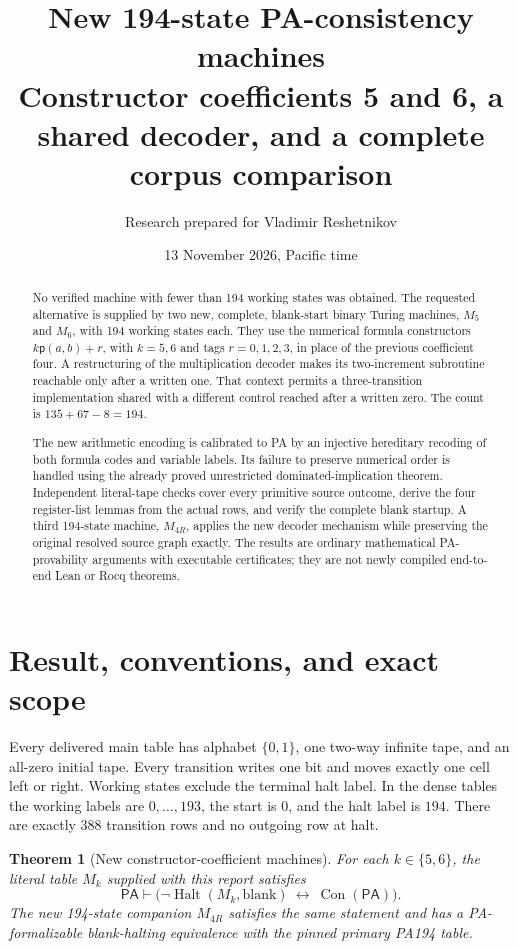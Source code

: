 \documentclass[10pt,letterpaper]{article}
\title{\color{ink}New 194-state PA-consistency machines\\[4pt]\large Constructor coefficients 5 and 6, a shared decoder, and a complete corpus comparison}
\author{Research prepared for Vladimir Reshetnikov}
\date{13 November 2026, Pacific time}
\newtheorem{theorem}{Theorem}
\newcommand{\PA}{\mathsf{PA}}
\newcommand{\Con}{\operatorname{Con}}
\newcommand{\Halt}{\operatorname{Halt}}
\newcommand{\pair}{\mathsf p}
\begin{document}
\maketitle
\begin{abstract}
No verified machine with fewer than 194 working states was obtained. The requested alternative is supplied by two new, complete, blank-start binary Turing machines, $M_5$ and $M_6$, with 194 working states each. They use the numerical formula constructors $k\pair(a,b)+r$, with $k=5,6$ and tags $r=0,1,2,3$, in place of the previous coefficient four. A restructuring of the multiplication decoder makes its two-increment subroutine reachable only after a written one. That context permits a three-transition implementation shared with a different control reached after a written zero. The count is $135+67-8=194$.

The new arithmetic encoding is calibrated to PA by an injective hereditary recoding of both formula codes and variable labels. Its failure to preserve numerical order is handled using the already proved unrestricted dominated-implication theorem. Independent literal-tape checks cover every primitive source outcome, derive the four register-list lemmas from the actual rows, and verify the complete blank startup. A third 194-state machine, $M_{4R}$, applies the new decoder mechanism while preserving the original resolved source graph exactly. The results are ordinary mathematical PA-provability arguments with executable certificates; they are not newly compiled end-to-end Lean or Rocq theorems.
\end{abstract}
\tableofcontents

\section{Result, conventions, and exact scope}

Every delivered main table has alphabet $\{0,1\}$, one two-way infinite tape, and an all-zero initial tape. Every transition writes one bit and moves exactly one cell left or right. Working states exclude the terminal halt label. In the dense tables the working labels are $0,\ldots,193$, the start is $0$, and the halt label is $194$. There are exactly 388 transition rows and no outgoing row at halt.

\begin{theorem}[New constructor-coefficient machines]
For each $k\in\{5,6\}$, the literal table $M_k$ supplied with this report satisfies
\[
  \PA\vdash\bigl(\neg\Halt(M_k,\text{blank})\ \longleftrightarrow\ \Con(\PA)\bigr).
\]
The new 194-state companion $M_{4R}$ satisfies the same statement and has a PA-formalizable blank-halting equivalence with the pinned primary PA194 table.
\end{theorem}
\end{document}
